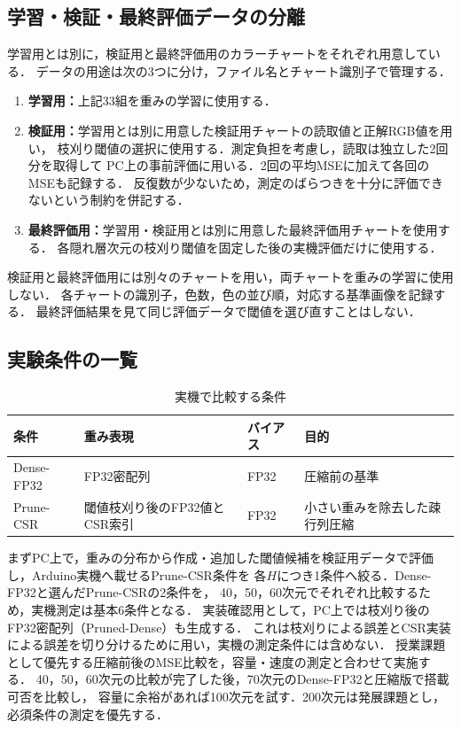 \documentclass[a4paper,11pt]{article}
\begin{document}
\subsection{学習・検証・最終評価データの分離}

学習用とは別に，検証用と最終評価用のカラーチャートをそれぞれ用意している．
データの用途は次の3つに分け，ファイル名とチャート識別子で管理する．
\begin{enumerate}
  \item \textbf{学習用：}上記33組を重みの学習に使用する．
  \item \textbf{検証用：}学習用とは別に用意した検証用チャートの読取値と正解RGB値を用い，
    枝刈り閾値の選択に使用する．測定負担を考慮し，読取は独立した2回分を取得して
    PC上の事前評価に用いる．2回の平均MSEに加えて各回のMSEも記録する．
    反復数が少ないため，測定のばらつきを十分に評価できないという制約を併記する．
  \item \textbf{最終評価用：}学習用・検証用とは別に用意した最終評価用チャートを使用する．
    各隠れ層次元の枝刈り閾値を固定した後の実機評価だけに使用する．
\end{enumerate}
検証用と最終評価用には別々のチャートを用い，両チャートを重みの学習に使用しない．
各チャートの識別子，色数，色の並び順，対応する基準画像を記録する．
最終評価結果を見て同じ評価データで閾値を選び直すことはしない．

\subsection{実験条件の一覧}

\begin{table}[H]
  \centering
  \caption{実機で比較する条件}
  \label{tab:conditions}
  \begin{tabularx}{\linewidth}{P{30mm}P{40mm}P{20mm}Y}
    \toprule
    条件 & 重み表現 & バイアス & 目的 \\
    \midrule
    Dense-FP32 & FP32密配列 & FP32 & 圧縮前の基準 \\
    Prune-CSR & 閾値枝刈り後のFP32値とCSR索引 & FP32 & 小さい重みを除去した疎行列圧縮 \\
    \bottomrule
  \end{tabularx}
\end{table}

まずPC上で，重みの分布から作成・追加した閾値候補を検証用データで評価し，Arduino実機へ載せるPrune-CSR条件を
各$H$につき1条件へ絞る．Dense-FP32と選んだPrune-CSRの2条件を，
40，50，60次元でそれぞれ比較するため，実機測定は基本6条件となる．
実装確認用として，PC上では枝刈り後のFP32密配列（Pruned-Dense）も生成する．
これは枝刈りによる誤差とCSR実装による誤差を切り分けるために用い，実機の測定条件には含めない．
授業課題として優先する圧縮前後のMSE比較を，容量・速度の測定と合わせて実施する．
40，50，60次元の比較が完了した後，70次元のDense-FP32と圧縮版で搭載可否を比較し，
容量に余裕があれば100次元を試す．200次元は発展課題とし，必須条件の測定を優先する．
\end{document}
